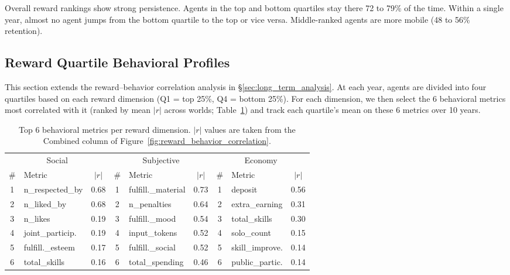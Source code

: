 Overall reward rankings show strong persistence.
Agents in the top and bottom quartiles stay there 72 to 79\% of the time.
Within a single year, almost no agent jumps from the bottom quartile to the top or vice versa.
Middle-ranked agents are more mobile (48 to 56\% retention).


\subsection{Reward Quartile Behavioral Profiles}
\label{sec:appendix_reward_success_profile}

This section extends the reward--behavior correlation analysis in \S\ref{sec:long_term_analysis}.
At each year, agents are divided into four quartiles based on each reward dimension
(Q1 = top 25\%, Q4 = bottom 25\%).
For each dimension, we then select the 6 behavioral metrics most correlated with it
(ranked by mean $|r|$ across worlds; Table~\ref{tab:success_top_metrics})
and track each quartile's mean on these 6 metrics over 10 years.

\begin{table}[htbp]
  \centering
  \caption{%
    Top 6 behavioral metrics per reward dimension.
    $|r|$ values are taken from the Combined column of
    Figure~\ref{fig:reward_behavior_correlation}.
  }
  \label{tab:success_top_metrics}
  \small
  \begin{tabular}{clcclcclc}
    \toprule
    \multicolumn{3}{c}{Social} & \multicolumn{3}{c}{Subjective} & \multicolumn{3}{c}{Economy} \\
    \cmidrule(lr){1-3} \cmidrule(lr){4-6} \cmidrule(lr){7-9}
    \# & Metric & $|r|$ & \# & Metric & $|r|$ & \# & Metric & $|r|$ \\
    \midrule
    1 & n\_respected\_by   & 0.68 & 1 & fulfill.\_material   & 0.73 & 1 & deposit              & 0.56 \\
    2 & n\_liked\_by       & 0.68 & 2 & n\_penalties         & 0.64 & 2 & extra\_earning       & 0.31 \\
    3 & n\_likes           & 0.19 & 3 & fulfill.\_mood       & 0.54 & 3 & total\_skills        & 0.30 \\
    4 & joint\_particip.   & 0.19 & 4 & input\_tokens        & 0.52 & 4 & solo\_count          & 0.15 \\
    5 & fulfill.\_esteem   & 0.17 & 5 & fulfill.\_social     & 0.52 & 5 & skill\_improve.      & 0.14 \\
    6 & total\_skills      & 0.16 & 6 & total\_spending      & 0.46 & 6 & public\_partic.      & 0.14 \\
    \bottomrule
  \end{tabular}
\end{table}


